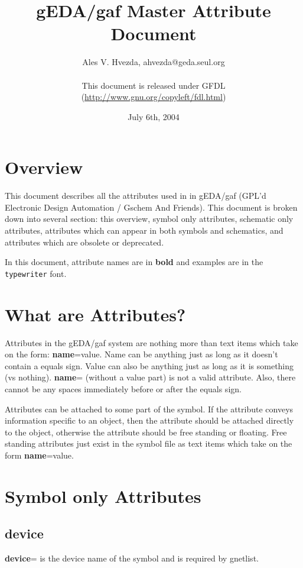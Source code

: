 \documentclass{article}
\title{gEDA/gaf Master Attribute Document}
\author{Ales V. Hvezda, ahvezda@geda.seul.org\\
	\\
	This document is released under GFDL\\ 
        (\url{http://www.gnu.org/copyleft/fdl.html})}
\date{July 6th, 2004}
\begin{document}
\maketitle
\newpage

\tableofcontents
\newpage


\section{Overview}

This document describes all the attributes used in in gEDA/gaf (GPL'd
Electronic Design Automation / Gschem And Friends).  This document
is broken down into several section: this overview, symbol only
attributes, schematic only attributes, attributes which can appear
in both symbols and schematics, and attributes which are obsolete or
deprecated.

In this document, attribute names are in {\bf bold} and examples
are in the \texttt{typewriter} font.

\section{What are Attributes?}

Attributes in the gEDA/gaf system are nothing more than text items
which take on the form: {\bf name}=value.  Name can be anything just as long
as it doesn't contain a equals sign.  Value can also be anything just
as long as it is something (vs nothing).  {\bf name}= (without a value part)
is not a valid attribute.  Also, there cannot be any spaces immediately
before or after the equals sign.

Attributes can be attached to some part of the symbol.  If the attribute
conveys information specific to an object, then the attribute should
be attached directly to the object, otherwise the attribute should be
free standing or floating.  Free standing attributes just exist in the
symbol file as text items which take on the form {\bf name}=value.

\newpage

\section{Symbol only Attributes}


\subsection{\bf device\label{device}}
{\bf device}= is the device name of the symbol and is required by gnetlist.  
\end{document}
